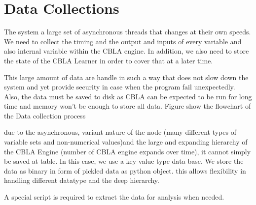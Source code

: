 \section{Data Collections}

The system a large set of asynchronous threads that changes at their own speeds. We need to collect the timing and the output and inputs of every variable and also internal variable within the CBLA engine. In addition, we also need to store the state of the CBLA Learner in order to cover that at a later time. 

This large amount of data are handle in such a way that does not slow down the system and yet provide security in case when the program fail unexpectedly. Also, the data must be saved to disk as CBLA can be expected to be run for long time and memory won't be enough to store all data. 
Figure show the flowchart of the Data collection process

due to the asynchronous, variant nature of the node (many different types of variable sets and non-numerical values)and the large and expanding hierarchy of the CBLA Engine (number of CBLA engine expands over time), it cannot simply be saved at table. In this case, we use a key-value type data base. We store the data as binary in form of pickled data as python object. this allows flexibility in handling different datatype and the deep hierarchy. 

A special script is required to extract the data for analysis when needed. 

